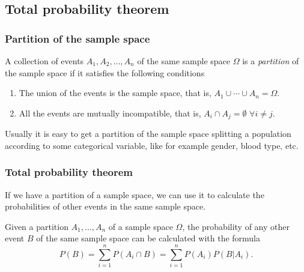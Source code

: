 \subsection{Total probability theorem}

\begin{frame}
\frametitle{Partition of the sample space}
\begin{definition}
A collection of events $A_1,A_2,\ldots,A_n$ of the same sample space $\Omega$ is a \emph{partition} of the sample space if it satisfies the following conditions
\begin{enumerate}
\item The union of the events is the sample space, that is, $A_1\cup \cdots\cup A_n =\Omega$.
\item All the events are mutually incompatible, that is, $A_i\cap A_j = \emptyset$ $\forall i\neq j$.
\end{enumerate}
\end{definition}

\begin{center}

\end{center}

Usually it is easy to get a partition of the sample space splitting a population according to some categorical variable, like for example gender, blood type, etc.
\end{frame}


\begin{frame}
\frametitle{Total probability theorem}
If we have a partition of a sample space, we can use it to calculate the probabilities of other events in the same
sample space.
\begin{theorem}
Given a partition $A_1,\ldots,A_n$ of a sample space $\Omega$, the probability of any other event $B$ of the same sample
space can be calculated with the formula
\[
P(B) = \sum_{i=1}^n P(A_i\cap B) = \sum_{i=1}^n P(A_i)P(B|A_i).
\]
\end{theorem}
\end{frame}


